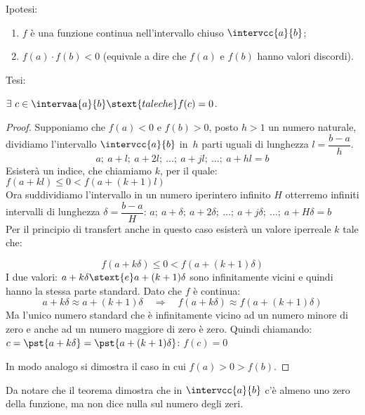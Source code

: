\noindent Ipotesi: \nopagebreak
\begin{enumerate}[nosep]
 \item \(f\) è una funzione continua nell'intervallo chiuso 
\(\intervcc{a}{b}\);
 \item \(f(a) \cdot f(b) < 0\) 
 (equivale a dire che \(f(a)\) e \(f(b)\) hanno valori discordi).
\end{enumerate}

\noindent Tesi: 

\(\exists~c \in \intervaa{a}{b} \stext{ tale che } f(c)=0\).

\begin{proof}
Supponiamo che \(f(a)<0\) e \(f(b)>0\), posto \(h > 1\) un numero naturale, 
dividiamo l'intervallo \(\intervcc{a}{b}\) in~\(h\) parti uguali 
di lunghezza \(l = \dfrac{b -a}{h}\).
\[a;~a+l;~a+2l;~\dots;~a+jl;~\dots;~a+hl=b\]
Esisterà un indice, che chiamiamo \(k\), per il quale: \qquad
\(f(a+kl) \leqslant 0 < f(a+(k+1)l)\)\\
Ora suddividiamo l'intervallo in un numero iperintero infinito \(H\) 
otterremo infiniti intervalli di lunghezza \(\delta = \dfrac{b -a}{H}\):
\qquad \(a;~a+\delta;~a+2\delta;~\dots;~a+j\delta;~\dots;~a+H\delta=b\)\\
Per il principio di transfert anche in questo caso esisterà un valore 
iperreale \(k\) tale che:

\noindent\begin{minipage}{.58\textwidth}
\[f(a+k\delta) \leqslant 0 < f(a+(k+1)\delta)\]
I due valori: \(a+k\delta \stext{ e }a+(k+1)\delta\) sono infinitamente 
vicini e quindi hanno la stessa parte standard.
Dato che \(f\) è continua:
\[a+k\delta \approx a+(k+1)\delta \quad \Rightarrow \quad 
f(a+k\delta) \approx f(a+(k+1)\delta)\] 
Ma l'unico numero standard che è infinitamente vicino ad un numero
minore di zero e anche ad un numero maggiore di zero è zero. 
Quindi chiamando: \(c=\pst{a+k\delta}=\pst{a+(k+1)\delta}\): \quad 
\(f(c)=0\)
\end{minipage}
\hfill
\begin{minipage}{.38\textwidth}
\begin{center} \tzeri \end{center}
\end{minipage}

In modo analogo si dimostra il caso in cui \(f(a)>0>f(b)\).
\end{proof}
Da notare che il teorema dimostra che in \(\intervcc{a}{b}\) c'è almeno uno 
zero della funzione, ma non dice nulla sul numero degli zeri.

